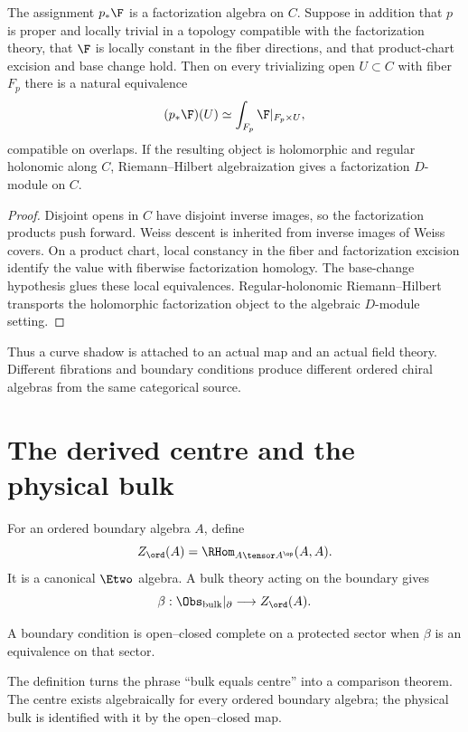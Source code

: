 \begin{theorem}
The assignment $p_*\F$ is a factorization algebra on $C$. Suppose in addition that $p$ is proper and locally trivial in a topology compatible with the factorization theory, that $\F$ is locally constant in the fiber directions, and that product-chart excision and base change hold. Then on every trivializing open $U\subset C$ with fiber $F_p$ there is a natural equivalence
\[
 (p_*\F)(U)\simeq
 \int_{F_p}\F|_{F_p\times U},
\]
compatible on overlaps. If the resulting object is holomorphic and regular holonomic along $C$, Riemann--Hilbert algebraization gives a factorization $D$-module on $C$.
\end{theorem}
\begin{proof}
Disjoint opens in $C$ have disjoint inverse images, so the factorization products push forward. Weiss descent is inherited from inverse images of Weiss covers. On a product chart, local constancy in the fiber and factorization excision identify the value with fiberwise factorization homology. The base-change hypothesis glues these local equivalences. Regular-holonomic Riemann--Hilbert transports the holomorphic factorization object to the algebraic $D$-module setting.
\end{proof}

Thus a curve shadow is attached to an actual map and an actual field theory. Different fibrations and boundary conditions produce different ordered chiral algebras from the same categorical source.

\chapter{The derived centre and the physical bulk}
For an ordered boundary algebra $A$, define
\[
 Z_{\ord}(A)=\RHom_{A\tensor A^{\op}}(A,A).
\]
It is a canonical $\Etwo$ algebra. A bulk theory acting on the boundary gives
\[
 \beta:\Obs_{\mathrm{bulk}}|_{\partial}\longrightarrow Z_{\ord}(A).
\]

\begin{definition}
A boundary condition is open--closed complete on a protected sector when $\beta$ is an equivalence on that sector.
\end{definition}

The definition turns the phrase ``bulk equals centre'' into a comparison theorem. The centre exists algebraically for every ordered boundary algebra; the physical bulk is identified with it by the open--closed map.

